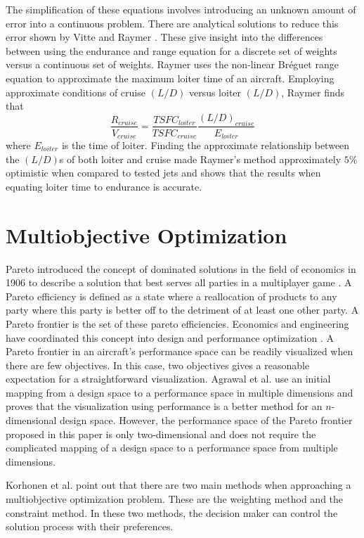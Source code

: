 \par 
The simplification of these equations involves introducing an unknown amount of error into a continuous problem. There are analytical solutions to reduce this error shown by Vitte \cite{OptimizeBreguet} and Raymer \cite{LoiterTimeFromRange}. These give insight into the differences between using the endurance and range equation for a discrete set of weights versus a continuous set of weights. Raymer \cite{LoiterTimeFromRange} uses the non-linear Br\'eguet range equation to approximate the maximum loiter time of an aircraft. Employing approximate conditions of cruise $(L/D)$ versus loiter $(L/D)$, Raymer \cite{LoiterTimeFromRange} finds that 
\begin{equation}
    \dfrac{R_{cruise}}{V_{cruise}} = \dfrac{TSFC_{loiter}}{TSFC_{cruise}}\dfrac{(L/D)_{cruise}}{E_{loiter}}
\end{equation}
where $E_{loiter}$ is the time of loiter. Finding the approximate relationship between the $(L/D)$s of both loiter and cruise made Raymer's method approximately $5\%$ optimistic when compared to tested jets and shows that the results when equating loiter time to endurance is accurate.
\section{Multiobjective Optimization}
Pareto introduced the concept of dominated solutions in the field of economics in 1906 to describe a solution that best serves all parties in a multiplayer game \cite{paretomanual}. A Pareto efficiency is defined as a state where a reallocation of products to any party where this party is better off to the detriment of at least one other party. A Pareto frontier is the set of these pareto efficiencies. Economics and engineering have coordinated this concept into design and performance optimization \cite{surveyMarler}. A Pareto frontier in an aircraft's performance space can be readily visualized when there are few objectives. In this case, two objectives gives a reasonable expectation for a straightforward visualization. Agrawal et al. \cite{MultiobjectiveVisualization} use an initial mapping from a design space to a performance space in multiple dimensions and proves that the visualization using performance is a better method for an $n$-dimensional design space. However, the performance space of the Pareto frontier proposed in this paper is only two-dimensional and does not require the complicated mapping of a design space to a performance space from multiple dimensions. 
\par
Korhonen et al. \cite{MultOptCS} point out that there are two main methods when approaching a multiobjective optimization problem. These are the weighting method and the constraint method. In these two methods, the decision maker can control the solution process with their preferences.\par
